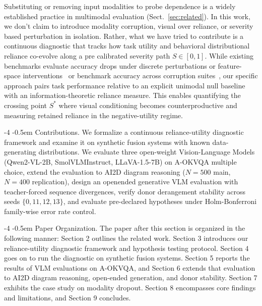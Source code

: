 \documentclass[graybox]{svmult}
\makeatletter
\renewcommand\paragraph{\@startsection{paragraph}{4}{\z@}%
  {-4\p@ \@plus -1\p@ \@minus -1\p@}%
  {-0.5em}%
  {\normalfont\normalsize\bfseries}}
\makeatother
\begin{document}
Substituting or removing input modalities to probe dependence is a widely established practice in multimodal evaluation (Sect.~\ref{sec:related}). In this work, we don't claim to introduce modality corruption, visual over reliance, or severity based perturbation in isolation. Rather, what we have tried to contribute is a continuous diagnostic that tracks how task utility and behavioral distributional reliance co-evolve along a pre calibrated severity path $S \in [0, 1]$. While existing benchmarks evaluate accuracy drops under discrete perturbations or feature-space interventions~\cite{gupta2022swapmix,cai2025interference} or benchmark accuracy across corruption suites~\cite{saxena2026robustbench}, our specific approach pairs task performance relative to an explicit unimodal null baseline with an information-theoretic reliance measure. This enables quantifying the crossing point $S^*$ where visual conditioning becomes counterproductive and measuring retained reliance in the negative-utility regime.

\paragraph{Contributions.}
We formalize a continuous reliance-utility diagnostic framework and examine it on synthetic fusion systems with known data-generating distributions. We evaluate three open-weight Vision-Language Models (Qwen2-VL-2B, SmolVLMInstruct, LLaVA-1.5-7B) on A-OKVQA multiple choice, extend the evaluation to AI2D diagram reasoning ($N = 500$ main, $N = 400$ replication), design an openended generative VLM evaluation with teacher-forced sequence divergences, verify donor derangement stability across seeds $\{0,11,12,13\}$, and evaluate pre-declared hypotheses under Holm-Bonferroni family-wise error rate control.

\paragraph{Paper Organization.}
The paper after this section is organized in the following manner: Section 2
outlines the related work. Section 3 introduces our reliance-utility diagnostic framework
and hypothesis testing protocol. Section 4 goes on to run the diagnostic on synthetic fusion
systems. Section 5 reports the results of  VLM evaluations on A-OKVQA, and Section 6 extends that
evaluation to AI2D diagram reasoning, open-ended generation, and donor stability.
Section 7 exhibits the case study on modality dropout. Section 8 encompasses core findings and
limitations, and Section 9 concludes.
\end{document}
